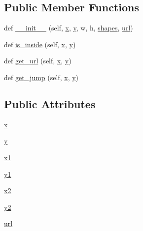 \subsection*{Public Member Functions}
\begin{DoxyCompactItemize}
\item 
def \hyperlink{classsmacc__viewer_1_1xdot_1_1xdot__qt_1_1Node_ae9c385c0c88c53fefb05cfb2197de63b}{\+\_\+\+\_\+init\+\_\+\+\_\+} (self, \hyperlink{classsmacc__viewer_1_1xdot_1_1xdot__qt_1_1Node_a85d5d46a7ec138627e137f9cefd5a0ad}{x}, \hyperlink{classsmacc__viewer_1_1xdot_1_1xdot__qt_1_1Node_a61b07e1b4eebf60613eaed0a5e1204e4}{y}, w, h, \hyperlink{classsmacc__viewer_1_1xdot_1_1xdot__qt_1_1CompoundShape_ad2f848b99323a9a844ffa4769737f69e}{shapes}, \hyperlink{classsmacc__viewer_1_1xdot_1_1xdot__qt_1_1Node_aaa2ca7fd71f0858125aaca32c925858f}{url})
\item 
def \hyperlink{classsmacc__viewer_1_1xdot_1_1xdot__qt_1_1Node_a02f21863c16541b673dc4d8ebeafbf00}{is\+\_\+inside} (self, \hyperlink{classsmacc__viewer_1_1xdot_1_1xdot__qt_1_1Node_a85d5d46a7ec138627e137f9cefd5a0ad}{x}, \hyperlink{classsmacc__viewer_1_1xdot_1_1xdot__qt_1_1Node_a61b07e1b4eebf60613eaed0a5e1204e4}{y})
\item 
def \hyperlink{classsmacc__viewer_1_1xdot_1_1xdot__qt_1_1Node_af0fc77bf1b42b587c92d2338bbbca7ef}{get\+\_\+url} (self, \hyperlink{classsmacc__viewer_1_1xdot_1_1xdot__qt_1_1Node_a85d5d46a7ec138627e137f9cefd5a0ad}{x}, \hyperlink{classsmacc__viewer_1_1xdot_1_1xdot__qt_1_1Node_a61b07e1b4eebf60613eaed0a5e1204e4}{y})
\item 
def \hyperlink{classsmacc__viewer_1_1xdot_1_1xdot__qt_1_1Node_a24e7ffc56c0660c97aba2ddcde328dbb}{get\+\_\+jump} (self, \hyperlink{classsmacc__viewer_1_1xdot_1_1xdot__qt_1_1Node_a85d5d46a7ec138627e137f9cefd5a0ad}{x}, \hyperlink{classsmacc__viewer_1_1xdot_1_1xdot__qt_1_1Node_a61b07e1b4eebf60613eaed0a5e1204e4}{y})
\end{DoxyCompactItemize}
\subsection*{Public Attributes}
\begin{DoxyCompactItemize}
\item 
\hyperlink{classsmacc__viewer_1_1xdot_1_1xdot__qt_1_1Node_a85d5d46a7ec138627e137f9cefd5a0ad}{x}
\item 
\hyperlink{classsmacc__viewer_1_1xdot_1_1xdot__qt_1_1Node_a61b07e1b4eebf60613eaed0a5e1204e4}{y}
\item 
\hyperlink{classsmacc__viewer_1_1xdot_1_1xdot__qt_1_1Node_ae31872230f5ef222322a4cc04e7d5df8}{x1}
\item 
\hyperlink{classsmacc__viewer_1_1xdot_1_1xdot__qt_1_1Node_aaef3e410d013f329d8b7a6528ae77156}{y1}
\item 
\hyperlink{classsmacc__viewer_1_1xdot_1_1xdot__qt_1_1Node_a6db9655a45494d9daff50dfedb593db3}{x2}
\item 
\hyperlink{classsmacc__viewer_1_1xdot_1_1xdot__qt_1_1Node_ab028844a0751b9ea11e89cc25f6b54cd}{y2}
\item 
\hyperlink{classsmacc__viewer_1_1xdot_1_1xdot__qt_1_1Node_aaa2ca7fd71f0858125aaca32c925858f}{url}
\end{DoxyCompactItemize}



